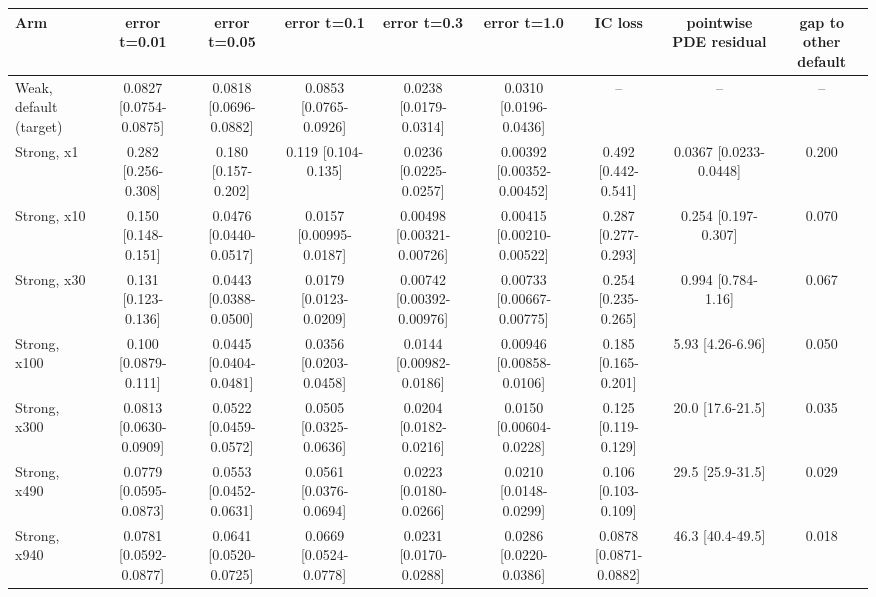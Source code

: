 \begin{tabular}{lcccccccc}
\toprule
Arm & error t=0.01 & error t=0.05 & error t=0.1 & error t=0.3 & error t=1.0 & IC loss & pointwise PDE residual & gap to other default \\
\midrule
Weak, default (target) & 0.0827 {\scriptsize[0.0754-0.0875]} & 0.0818 {\scriptsize[0.0696-0.0882]} & 0.0853 {\scriptsize[0.0765-0.0926]} & 0.0238 {\scriptsize[0.0179-0.0314]} & 0.0310 {\scriptsize[0.0196-0.0436]} & -- & -- & -- \\
Strong, x1 & 0.282 {\scriptsize[0.256-0.308]} & 0.180 {\scriptsize[0.157-0.202]} & 0.119 {\scriptsize[0.104-0.135]} & 0.0236 {\scriptsize[0.0225-0.0257]} & 0.00392 {\scriptsize[0.00352-0.00452]} & 0.492 {\scriptsize[0.442-0.541]} & 0.0367 {\scriptsize[0.0233-0.0448]} & 0.200 \\
Strong, x10 & 0.150 {\scriptsize[0.148-0.151]} & 0.0476 {\scriptsize[0.0440-0.0517]} & 0.0157 {\scriptsize[0.00995-0.0187]} & 0.00498 {\scriptsize[0.00321-0.00726]} & 0.00415 {\scriptsize[0.00210-0.00522]} & 0.287 {\scriptsize[0.277-0.293]} & 0.254 {\scriptsize[0.197-0.307]} & 0.070 \\
Strong, x30 & 0.131 {\scriptsize[0.123-0.136]} & 0.0443 {\scriptsize[0.0388-0.0500]} & 0.0179 {\scriptsize[0.0123-0.0209]} & 0.00742 {\scriptsize[0.00392-0.00976]} & 0.00733 {\scriptsize[0.00667-0.00775]} & 0.254 {\scriptsize[0.235-0.265]} & 0.994 {\scriptsize[0.784-1.16]} & 0.067 \\
Strong, x100 & 0.100 {\scriptsize[0.0879-0.111]} & 0.0445 {\scriptsize[0.0404-0.0481]} & 0.0356 {\scriptsize[0.0203-0.0458]} & 0.0144 {\scriptsize[0.00982-0.0186]} & 0.00946 {\scriptsize[0.00858-0.0106]} & 0.185 {\scriptsize[0.165-0.201]} & 5.93 {\scriptsize[4.26-6.96]} & 0.050 \\
Strong, x300 & 0.0813 {\scriptsize[0.0630-0.0909]} & 0.0522 {\scriptsize[0.0459-0.0572]} & 0.0505 {\scriptsize[0.0325-0.0636]} & 0.0204 {\scriptsize[0.0182-0.0216]} & 0.0150 {\scriptsize[0.00604-0.0228]} & 0.125 {\scriptsize[0.119-0.129]} & 20.0 {\scriptsize[17.6-21.5]} & 0.035 \\
Strong, x490 & 0.0779 {\scriptsize[0.0595-0.0873]} & 0.0553 {\scriptsize[0.0452-0.0631]} & 0.0561 {\scriptsize[0.0376-0.0694]} & 0.0223 {\scriptsize[0.0180-0.0266]} & 0.0210 {\scriptsize[0.0148-0.0299]} & 0.106 {\scriptsize[0.103-0.109]} & 29.5 {\scriptsize[25.9-31.5]} & 0.029 \\
Strong, x940 & 0.0781 {\scriptsize[0.0592-0.0877]} & 0.0641 {\scriptsize[0.0520-0.0725]} & 0.0669 {\scriptsize[0.0524-0.0778]} & 0.0231 {\scriptsize[0.0170-0.0288]} & 0.0286 {\scriptsize[0.0220-0.0386]} & 0.0878 {\scriptsize[0.0871-0.0882]} & 46.3 {\scriptsize[40.4-49.5]} & 0.018 \\

\end{tabular}
